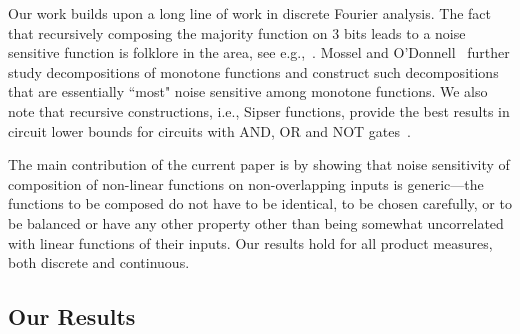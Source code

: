 \documentclass[12pt,letterpaper]{amsart}
\newcommand{\1}[1]{1_{\left\{#1\right\}}}
\theoremstyle{definition}
\theoremstyle{remark}
\begin{document}
Our work builds upon a long line of work in discrete Fourier analysis.
The fact that recursively composing the majority function on $3$ bits leads to a noise sensitive function is folklore in the area, see e.g.,~\cite{BenorLinial:90,BeKaSc:99}.
Mossel and O'Donnell~\cite{MosselODonnell:02} further study decompositions of monotone functions and construct such decompositions that are essentially ``most" noise sensitive among monotone functions. 
We also note that recursive constructions, i.e., Sipser functions, provide the best results in circuit lower bounds for circuits with AND, OR and NOT gates~\cite{HRRT:17}. 

The main contribution of the current paper is by showing that noise sensitivity of composition of non-linear functions on non-overlapping inputs is generic---the functions to be composed do not have to be identical, to be chosen carefully, or to be balanced or have any other property other than being somewhat uncorrelated with linear functions of their inputs. 
Our results hold for all product measures, both discrete and continuous.

\subsection{Our Results}
\end{document}
